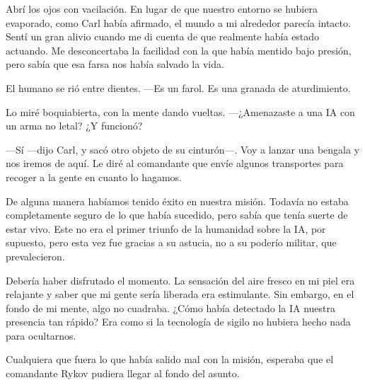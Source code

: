 Abrí los ojos con vacilación. En lugar de que nuestro entorno se hubiera evaporado, como Carl había afirmado, el mundo a mi alrededor parecía intacto. Sentí un gran alivio cuando me di cuenta de que realmente había estado actuando. Me desconcertaba la facilidad con la que había mentido bajo presión, pero sabía que esa farsa nos había salvado la vida.

El humano se rió entre dientes. —Es un farol. Es una granada de aturdimiento.

Lo miré boquiabierta, con la mente dando vueltas. —¿Amenazaste a una IA con un arma no letal? ¿Y funcionó?

—Sí —dijo Carl, y sacó otro objeto de su cinturón—. Voy a lanzar una bengala y nos iremos de aquí. Le diré al comandante que envíe algunos transportes para recoger a la gente en cuanto lo hagamos.

De alguna manera habíamos tenido éxito en nuestra misión. Todavía no estaba completamente seguro de lo que había sucedido, pero sabía que tenía suerte de estar vivo. Este no era el primer triunfo de la humanidad sobre la IA, por supuesto, pero esta vez fue gracias a su astucia, no a su poderío militar, que prevalecieron.

Debería haber disfrutado el momento. La sensación del aire fresco en mi piel era relajante y saber que mi gente sería liberada era estimulante. Sin embargo, en el fondo de mi mente, algo no cuadraba. ¿Cómo había detectado la IA nuestra presencia tan rápido? Era como si la tecnología de sigilo no hubiera hecho nada para ocultarnos.

Cualquiera que fuera lo que había salido mal con la misión, esperaba que el comandante Rykov pudiera llegar al fondo del asunto.
